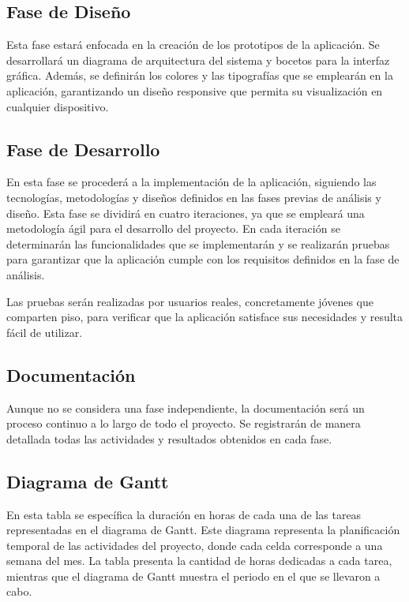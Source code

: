 \subsection{Fase de Diseño}
Esta fase estará enfocada en la creación de los prototipos de la aplicación. Se desarrollará un diagrama de arquitectura del sistema y bocetos para la interfaz gráfica. Además, se definirán 
los colores y las tipografías que se emplearán en la aplicación, garantizando un diseño responsive que permita su visualización en cualquier dispositivo.

\subsection{Fase de Desarrollo}
En esta fase se procederá a la implementación de la aplicación, siguiendo las tecnologías, metodologías y diseños definidos en las fases previas de análisis y diseño. Esta fase se dividirá en cuatro iteraciones,
ya que se empleará una metodología ágil para el desarrollo del proyecto. En cada iteración se determinarán las funcionalidades que se implementarán y se realizarán pruebas para garantizar 
que la aplicación cumple con los requisitos definidos en la fase de análisis.

Las pruebas serán realizadas por usuarios reales, concretamente jóvenes que comparten piso, para verificar que la aplicación satisface sus necesidades y resulta fácil de utilizar.

\subsection{Documentación}
Aunque no se considera una fase independiente, la documentación será un proceso continuo a lo largo de todo el proyecto. Se registrarán de manera detallada todas las actividades y resultados obtenidos en cada fase. 

\subsection{Diagrama de Gantt}
En esta tabla se específica la duración en horas de cada una de las tareas representadas en el diagrama de Gantt. Este diagrama representa 
la planificación temporal de las actividades del proyecto, donde cada celda corresponde a una semana del mes. La tabla presenta la cantidad de horas
dedicadas a cada tarea, mientras que el diagrama de Gantt muestra el periodo en el que se llevaron a cabo. 

